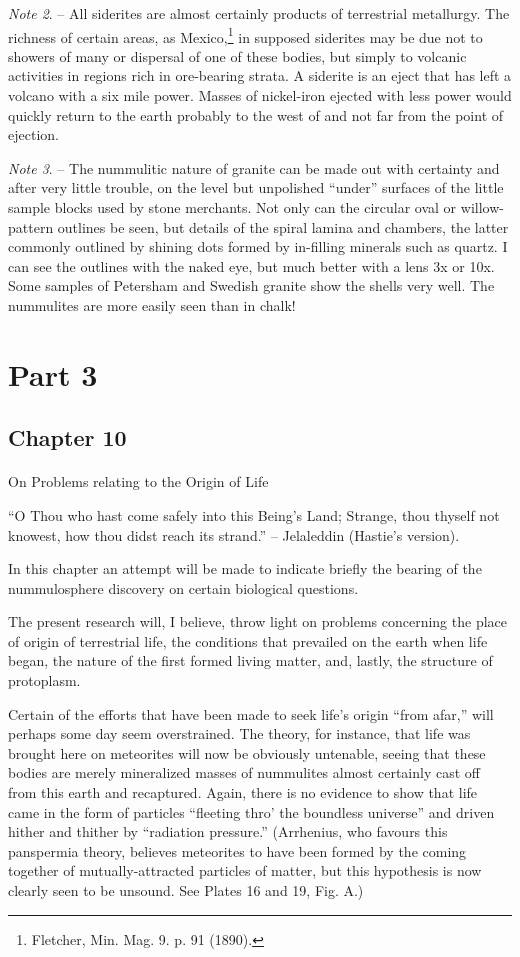 \documentclass[a4paper, 12pt, oneside]{article}
\begin{document}
\emph{Note 2}. -- All siderites are almost certainly products of terrestrial metallurgy. The richness of certain areas, as Mexico,\footnote{Fletcher, Min. Mag. 9. p. 91 (1890).} in supposed siderites may be due not to showers of many or dispersal of one of these bodies, but simply to volcanic activities in regions rich in ore-bearing strata. A siderite is an eject that has left a volcano with a six mile power. Masses of nickel-iron ejected with less power would quickly return to the earth probably to the west of and not far from the point of ejection.

\emph{Note 3}. -- The nummulitic nature of granite can be made out with certainty and after very little trouble, on the level but unpolished ``under'' surfaces of the little sample blocks used by stone merchants. Not only can the circular oval or willow-pattern outlines be seen, but details of the spiral lamina and chambers, the latter commonly outlined by shining dots formed by in-filling minerals such as quartz. I can see the outlines with the naked eye, but much better with a lens 3x or 10x. Some samples of Petersham and Swedish granite show the shells very well. The nummulites are more easily seen than in chalk!
\clearpage
\section{Part 3}
\subsection{Chapter 10}
\paragraph{}
On Problems relating to the Origin of Life

``O Thou who hast come safely into this Being's Land;  
Strange, thou thyself not knowest, how thou didst reach its  
strand.'' -- Jelaleddin (Hastie's version).

In this chapter an attempt will be made to indicate briefly the bearing of the nummulosphere discovery on certain biological questions.

The present research will, I believe, throw light on problems concerning the place of origin of terrestrial life, the conditions that prevailed on the earth when life began, the nature of the first formed living matter, and, lastly, the structure of protoplasm.

Certain of the efforts that have been made to seek life's origin ``from afar,'' will perhaps some day seem overstrained. The theory, for instance, that life was brought here on meteorites will now be obviously untenable, seeing that these bodies are merely mineralized masses of nummulites almost certainly cast off from this earth and recaptured. Again, there is no evidence to show that life came in the form of particles ``fleeting thro' the boundless universe'' and driven hither and thither by ``radiation pressure.'' (Arrhenius, who favours this panspermia theory, believes meteorites to have been formed by the coming together of mutually-attracted particles of matter, but this hypothesis is now clearly seen to be unsound. See Plates 16 and 19, Fig. A.)
\end{document}
